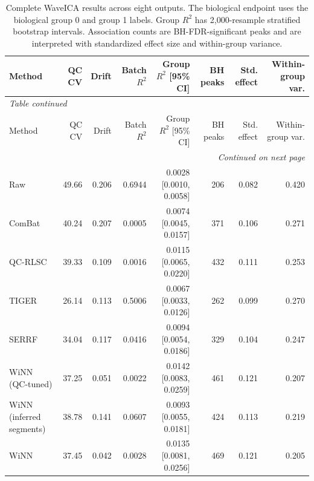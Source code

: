 \begin{landscape}
\scriptsize
\begin{longtable}{lrrrrrrr}
\caption{Complete WaveICA results across eight outputs. The biological endpoint uses the biological group 0 and group 1 labels. Group $R^2$ has 2,000-resample stratified bootstrap intervals. Association counts are BH-FDR-significant peaks and are interpreted with standardized effect size and within-group variance.}\label{tab:supp_waveica_all}\\
\toprule
Method & QC CV & Drift & Batch $R^2$ & Group $R^2$ [95\% CI] & BH peaks & Std. effect & Within-group var. \\
\midrule
\endfirsthead
\multicolumn{8}{l}{\textit{Table \thetable{} continued}}\\
\toprule
Method & QC CV & Drift & Batch $R^2$ & Group $R^2$ [95\% CI] & BH peaks & Std. effect & Within-group var. \\
\midrule
\endhead
\midrule
\multicolumn{8}{r}{\textit{Continued on next page}}\\
\endfoot
\bottomrule
\endlastfoot
Raw & 49.66 & 0.206 & 0.6944 & 0.0028 [0.0010, 0.0058] & 206 & 0.082 & 0.420 \\
ComBat & 40.24 & 0.207 & 0.0005 & 0.0074 [0.0045, 0.0157] & 371 & 0.106 & 0.271 \\
QC-RLSC & 39.33 & 0.109 & 0.0016 & 0.0115 [0.0065, 0.0220] & 432 & 0.111 & 0.253 \\
TIGER & 26.14 & 0.113 & 0.5006 & 0.0067 [0.0033, 0.0126] & 262 & 0.099 & 0.270 \\
SERRF & 34.04 & 0.117 & 0.0416 & 0.0094 [0.0054, 0.0186] & 329 & 0.104 & 0.247 \\
WiNN (QC-tuned) & 37.25 & 0.051 & 0.0022 & 0.0142 [0.0083, 0.0259] & 461 & 0.121 & 0.207 \\
WiNN (inferred segments) & 38.78 & 0.141 & 0.0607 & 0.0093 [0.0055, 0.0181] & 424 & 0.113 & 0.219 \\
WiNN & 37.45 & 0.042 & 0.0028 & 0.0135 [0.0081, 0.0256] & 469 & 0.121 & 0.205 \\
\end{longtable}
\end{landscape}
